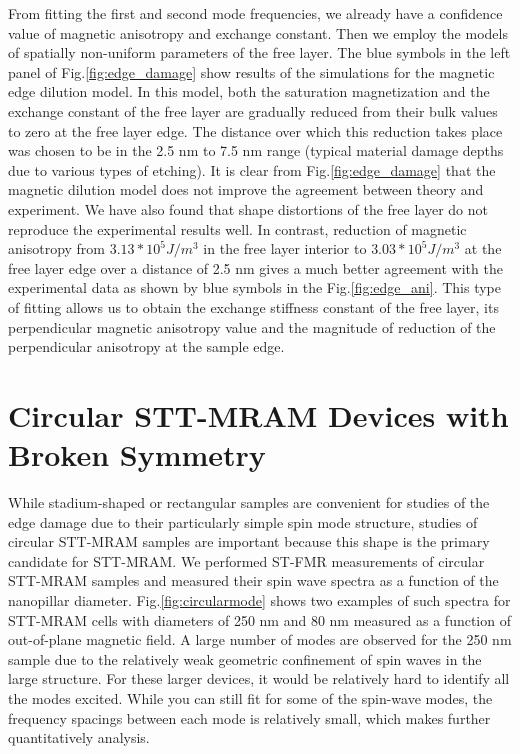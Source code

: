 From fitting the first and second mode frequencies, we already have a confidence value of magnetic anisotropy and exchange constant. Then we employ the models of spatially non-uniform parameters of the free layer. The blue symbols in the left panel of Fig.\ref{fig:edge_damage} show results of the simulations for the magnetic edge dilution model. In this model, both the saturation magnetization and the exchange constant of the free layer are gradually reduced from their bulk values to zero at the free layer edge. The distance over which this reduction takes place was chosen to be in the 2.5 nm to 7.5 nm range (typical material damage depths due to various types of etching). It is clear from Fig.\ref{fig:edge_damage} that the magnetic dilution model does not improve the agreement between theory and experiment. We have also found that shape distortions of the free layer do not reproduce the experimental results well. In contrast, reduction of magnetic anisotropy from  $3.13*10^5 J/m^3$ in the free layer interior to $3.03*10^5 J/m^3$ at the free layer edge over a distance of 2.5 nm gives a much better agreement with the experimental data as shown by blue symbols in the Fig.\ref{fig:edge_ani}. This type of fitting allows us to obtain the exchange stiffness constant of the free layer, its perpendicular magnetic anisotropy value and the magnitude of reduction of the perpendicular anisotropy at the sample edge.















\section{Circular STT-MRAM Devices with Broken Symmetry}

While stadium-shaped or rectangular samples are convenient for studies of the edge damage due to their particularly simple spin mode structure, studies of circular STT-MRAM samples are important because this shape is the primary candidate for STT-MRAM. We performed ST-FMR measurements of circular STT-MRAM samples and measured their spin wave spectra as a function of the nanopillar diameter. Fig.\ref{fig:circularmode} shows two examples of such spectra for STT-MRAM cells with diameters of 250 nm and 80 nm measured as a function of out-of-plane magnetic field. A large number of modes are observed for the 250 nm sample due to the relatively weak geometric confinement of spin waves in the large structure. For these larger devices, it would be relatively hard to identify all the modes excited. While you can still fit for some of the spin-wave modes, the frequency spacings between each mode is relatively small, which makes further quantitatively analysis.
 
